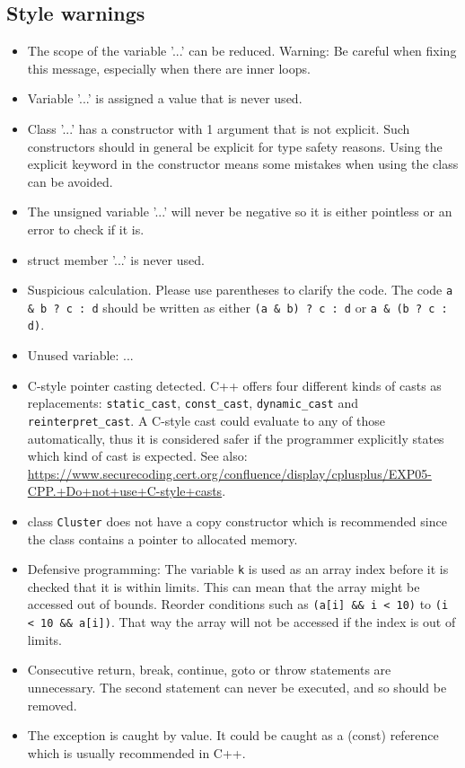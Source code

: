\documentclass[10pt,a4paper]{article}
\begin{document}
\subsection*{Style warnings}
\begin{itemize}
\item The scope of the variable '...' can be reduced. Warning: Be careful when fixing this message, especially when there are inner loops.
\item Variable '...' is assigned a value that is never used.
\item Class '...' has a constructor with 1 argument that is not explicit. Such constructors should in general be explicit for type safety reasons. Using the explicit keyword in the constructor means some mistakes when using the class can be avoided.
\item The unsigned variable '...' will never be negative so it is either pointless or an error to check if it is.
\item struct member '...' is never used.
\item Suspicious calculation. Please use parentheses to clarify the code. The code \verb|a & b ? c : d| should be written as either \verb|(a & b) ? c : d| or \verb|a & (b ? c : d)|.
\item Unused variable: ...
\item C-style pointer casting detected. C++ offers four different kinds of casts as replacements: \verb|static_cast|, \verb|const_cast|, \verb|dynamic_cast| and \verb|reinterpret_cast|. A C-style cast could evaluate to any of those automatically, thus it is considered safer if the programmer explicitly states which kind of cast is expected. See also: \url{https://www.securecoding.cert.org/confluence/display/cplusplus/EXP05-CPP.+Do+not+use+C-style+casts}.
\item class \verb|Cluster| does not have a copy constructor which is recommended since the class contains a pointer to allocated memory.
\item Defensive programming: The variable \verb|k| is used as an array index before it is checked that it is within limits. This can mean that the array might be accessed out of bounds. Reorder conditions such as \verb|(a[i] && i < 10)| to \verb|(i < 10 && a[i])|. That way the array will not be accessed if the index is out of limits.
\item Consecutive return, break, continue, goto or throw statements are unnecessary. The second statement can never be executed, and so should be removed.
\item The exception is caught by value. It could be caught as a (const) reference which is usually recommended in C++.
\end{itemize}
\end{document}
